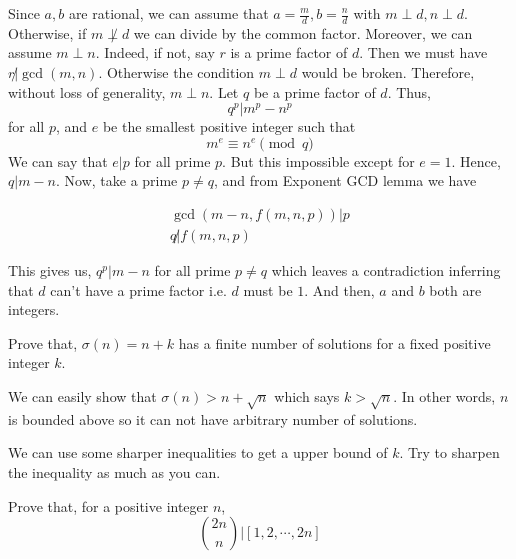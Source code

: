 \documentclass[problems.tex]{subfile}
\begin{document}
	\begin{solution}
		Since $a,b$ are rational, we can assume that $a=\frac{m}{d},b=\frac{n}{d}$ with $m\perp d,n\perp d$. Otherwise, if $m\not\perp d$ we can divide by the common factor. Moreover, we can assume $m\perp n$. Indeed, if not, say $r$ is a prime factor of $d$. Then we must have $r\not|\gcd(m,n)$. Otherwise the condition $m\perp d$ would be broken. Therefore, without loss of generality, $m\perp n$. Let $q$ be a prime factor of $d$. Thus, \[q^p|m^p-n^p\] for all $p$, and $e$ be the smallest positive integer such that \[m^e\equiv n^e\pmod q\]
		We can say that $e|p$ for all prime $p$. But this impossible except for $e=1$. Hence, $q|m-n$. Now, take a prime $p\neq q$, and from Exponent GCD lemma we have 
		
		\begin{align*}
			\gcd\left(m-n,f(m,n,p)\right) | p\\
			q\not|  f(m,n,p)
		\end{align*}
		
		
		
		This gives us, $q^p|m-n$ for all prime $p\neq q$ which leaves a contradiction inferring that $d$ can't have a prime factor i.e. $d$ must be $1$. And then, $a$ and $b$ both are integers.
	\end{solution}
	
	\begin{problem}
		Prove that, $\sigma(n)=n+k$ has a finite number of solutions for a fixed positive integer $k$.
	\end{problem}
	
	\begin{solution}
		We can easily show that $\sigma(n)>n+\sqrt{n}$ which says $k>\sqrt{n}$. In other words, $n$ is bounded above so it can not have arbitrary number of solutions.
	\end{solution}
	
	\begin{note}
		We can use some sharper inequalities to get a upper bound of $k$. Try to sharpen the inequality as much as you can.
	\end{note}
	
	\begin{problem}
		Prove that, for a positive integer $n$, \[\binom{2n}{n}|[1,2,\cdots,2n]\]
	\end{problem}
	
\end{document}
